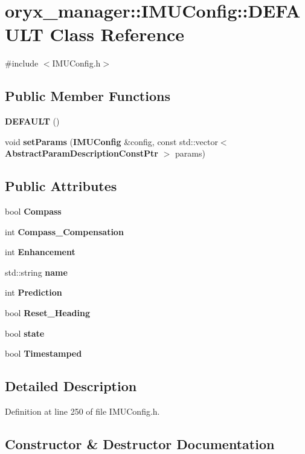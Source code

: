 \section{oryx\-\_\-manager\-:\-:\-I\-M\-U\-Config\-:\-:\-D\-E\-F\-A\-U\-L\-T \-Class \-Reference}
\label{classoryx__manager_1_1IMUConfig_1_1DEFAULT}


{\ttfamily \#include $<$\-I\-M\-U\-Config.\-h$>$}

\subsection*{\-Public \-Member \-Functions}
\begin{DoxyCompactItemize}
\item 
{\bf \-D\-E\-F\-A\-U\-L\-T} ()
\item 
void {\bf set\-Params} ({\bf \-I\-M\-U\-Config} \&config, const std\-::vector$<$ {\bf \-Abstract\-Param\-Description\-Const\-Ptr} $>$ params)
\end{DoxyCompactItemize}
\subsection*{\-Public \-Attributes}
\begin{DoxyCompactItemize}
\item 
bool {\bf \-Compass}
\item 
int {\bf \-Compass\-\_\-\-Compensation}
\item 
int {\bf \-Enhancement}
\item 
std\-::string {\bf name}
\item 
int {\bf \-Prediction}
\item 
bool {\bf \-Reset\-\_\-\-Heading}
\item 
bool {\bf state}
\item 
bool {\bf \-Timestamped}
\end{DoxyCompactItemize}


\subsection{\-Detailed \-Description}


\-Definition at line 250 of file \-I\-M\-U\-Config.\-h.



\subsection{\-Constructor \& \-Destructor \-Documentation}
